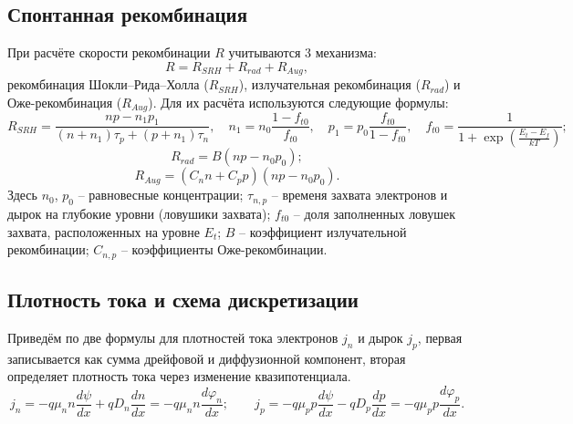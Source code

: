 \documentclass{article}
\begin{document}
\subsection{Спонтанная рекомбинация}
При расчёте скорости рекомбинации $R$ учитываются 3 механизма:
\begin{equation*}
    R = R_{SRH} + R_{rad} + R_{Aug},
\end{equation*}
рекомбинация Шокли--Рида--Холла ($R_{SRH}$), излучательная рекомбинация
($R_{rad}$) и Оже-рекомбинация ($R_{Aug}$). Для их расчёта используются
следующие формулы:
\begin{equation*}
    R_{SRH} = \frac{np - n_1 p_1}{(n + n_1)\tau_p + (p + n_1)\tau_n},
    \quad
    n_1 = n_0 \frac{1-f_{t0}}{f_{t0}},
    \quad
    p_1 = p_0 \frac{f_{t0}}{1-f_{t0}},
    \quad
    f_{t0} = \frac{1}{1 + \exp{\left(\frac{E_t-E_f}{kT}\right)}};
\end{equation*}
\begin{equation*}
    R_{rad} = B(np - n_0 p_0);
\end{equation*}
\begin{equation*}
    R_{Aug} = (C_n n + C_p p)(np - n_0 p_0).
\end{equation*}
Здесь $n_0$, $p_0$ -- равновесные концентрации;
$\tau_{n,p}$ -- временя захвата электронов и дырок на глубокие уровни
(ловушики захвата);
$f_{t0}$ -- доля заполненных ловушек захвата, расположенных на уровне $E_t$;
$B$ -- коэффициент излучательной рекомбинации;
$C_{n,p}$ -- коэффициенты Оже-рекомбинации.

\subsection{Плотность тока и схема дискретизации}
Приведём по две формулы для плотностей тока электронов $j_n$ и дырок $j_p$,
первая записывается как сумма дрейфовой и диффузионной компонент, вторая
определяет плотность тока через изменение квазипотенциала.
\begin{equation*}
	j_n = -q \mu_n n \frac{d\psi}{dx} + q D_n \frac{dn}{dx} =
	      -q \mu_n n \frac{d\varphi_n}{dx};
    \qquad
	j_p = -q \mu_p p \frac{d\psi}{dx} - q D_p \frac{dp}{dx} =
	      -q \mu_p p \frac{d\varphi_p}{dx}.
\end{equation*}
\end{document}
